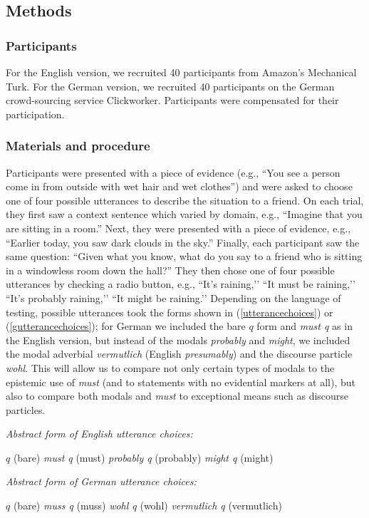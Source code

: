 \documentclass[11pt]{article}
\newcommand{\eref}[1]{(\ref{#1})}
\begin{document}
\subsection{Methods}

\subsubsection{Participants}

For the English version, we recruited 40 participants from Amazon's Mechanical Turk. For the German version, we recruited 40 participants on the German crowd-sourcing service Clickworker. Participants were compensated for their participation.

\subsubsection{Materials and procedure}

Participants were presented with a piece of evidence (e.g., ``You see a person come in from outside with wet hair and wet clothes'') and were asked to choose one of four possible utterances to describe the situation to a friend. On each trial, they first saw a context sentence which varied by domain, e.g., ``Imagine that you are sitting in a room.'' Next, they were presented with a piece of evidence, e.g., ``Earlier today, you saw dark clouds in the sky.'' Finally, each participant saw the same question: ``Given what you know, what do you say to a friend who is sitting in a windowless room down the hall?'' They then chose one of four possible utterances by checking a radio button, e.g., ``It's raining,’’ ``It must be raining,’’ ``It's probably raining,’’ ``It might be raining.’’ Depending on the language of testing, possible utterances took the forms shown in \eref{utterancechoices} or \eref{gutterancechoices}; for German we included the bare $q$ form and \emph{must q} as in the English version, but instead of the modals \emph{probably} and \emph{might}, we included the modal adverbial \emph{vermutlich} (English \emph{presumably}) and the discourse particle \emph{wohl}. This will allow us to compare not only certain types of modals to the epistemic use of \emph{must} (and to statements with no evidential markers at all), but also to compare both modals and \emph{must} to exceptional means such as discourse particles. 


\begin{exe}
	\ex\label{utterancechoices} \emph{Abstract form of English utterance choices:}
	\begin{xlist}
		\ex $q$ (bare)
		\ex \emph{must q} (must)
		\ex \emph{probably q} (probably)
		\ex \emph{might q} (might)
		\end{xlist}
	\ex\label{gutterancechoices} \emph{Abstract form of German utterance choices:}
	\begin{xlist}
		\ex $q$ (bare)
		\ex \emph{muss q} (muss)
		\ex \emph{wohl q} (wohl)
		\ex \emph{vermutlich q} (vermutlich)
		\end{xlist}
		\end{exe}
		
\end{document}
